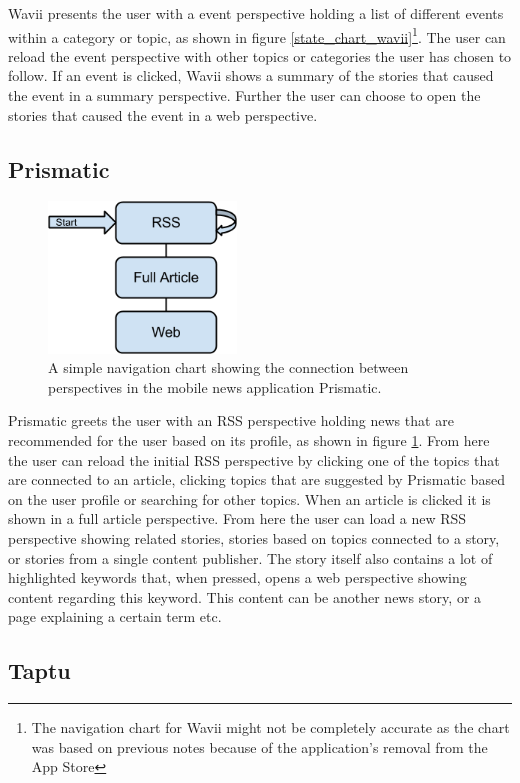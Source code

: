 Wavii presents the user with a event perspective holding a list of different events within a category or topic, as shown in figure \ref{state_chart_wavii}\footnote{The navigation chart for Wavii might not be completely accurate as the chart was based on previous notes because of the application's removal from the App Store}. The user can reload the event perspective with other topics or categories the user has chosen to follow. If an event is clicked, Wavii shows a summary of the stories that caused the event in a summary perspective. Further the user can choose to open the stories that caused the event in a web perspective.

\subsection{Prismatic}

\begin{figure}[!htbp]
\centering
\includegraphics[width=50mm]{GFX/statecharts/Prismatic.png}
\caption{A simple navigation chart showing the connection between perspectives in the mobile news application Prismatic.}
\label{state_chart_prismatic}
\end{figure}

Prismatic greets the user with an RSS perspective holding news that are recommended for the user based on its profile, as shown in figure \ref{state_chart_prismatic}. From here the user can reload the initial RSS perspective by clicking one of the topics that are connected to an article, clicking topics that are suggested by Prismatic based on the user profile or searching for other topics. When an article is clicked it is shown in a full article perspective. From here the user can load a new RSS perspective showing related stories, stories based on topics connected to a story, or stories from a single content publisher. The story itself also contains a lot of highlighted keywords that, when pressed, opens a web perspective showing content regarding this keyword. This content can be another news story, or a page explaining a certain term etc.

\subsection{Taptu}

